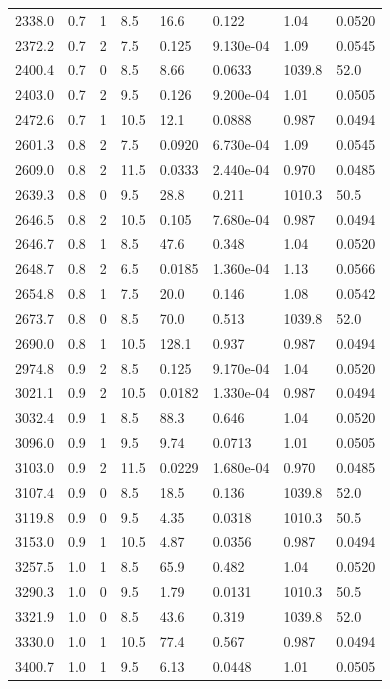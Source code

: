 \documentclass[preview]{standalone}
\begin{document}
{{{\begin{tabular}{L{1.2cm}C{1.2cm} C{0.3cm}C{0.5cm} C{1.4cm}C{1.4cm} C{1.4cm}C{1.4cm}}
  2338.0  &   0.7  & 1     & 8.5 &  16.6  & 0.122  & 1.04 &  0.0520   \\ 
  2372.2  &   0.7  & 2     & 7.5 &  0.125  & 9.130e-04  & 1.09 &  0.0545   \\ 
  2400.4  &   0.7  & 0     & 8.5 &  8.66  & 0.0633  & 1039.8 &  52.0   \\ 
  2403.0  &   0.7  & 2     & 9.5 &  0.126  & 9.200e-04  & 1.01 &  0.0505   \\ 
  2472.6  &   0.7  & 1     & 10.5 &  12.1  & 0.0888  & 0.987 &  0.0494   \\ 
  2601.3  &   0.8  & 2     & 7.5 &  0.0920  & 6.730e-04  & 1.09 &  0.0545   \\ 
  2609.0  &   0.8  & 2     & 11.5 &  0.0333  & 2.440e-04  & 0.970 &  0.0485   \\ 
  2639.3  &   0.8  & 0     & 9.5 &  28.8  & 0.211  & 1010.3 &  50.5   \\ 
  2646.5  &   0.8  & 2     & 10.5 &  0.105  & 7.680e-04  & 0.987 &  0.0494   \\ 
  2646.7  &   0.8  & 1     & 8.5 &  47.6  & 0.348  & 1.04 &  0.0520   \\ 
  2648.7  &   0.8  & 2     & 6.5 &  0.0185  & 1.360e-04  & 1.13 &  0.0566   \\ 
  2654.8  &   0.8  & 1     & 7.5 &  20.0  & 0.146  & 1.08 &  0.0542   \\ 
  2673.7  &   0.8  & 0     & 8.5 &  70.0  & 0.513  & 1039.8 &  52.0   \\ 
  2690.0  &   0.8  & 1     & 10.5 &  128.1  & 0.937  & 0.987 &  0.0494   \\ 
  2974.8  &   0.9  & 2     & 8.5 &  0.125  & 9.170e-04  & 1.04 &  0.0520   \\ 
  3021.1  &   0.9  & 2     & 10.5 &  0.0182  & 1.330e-04  & 0.987 &  0.0494   \\ 
  3032.4  &   0.9  & 1     & 8.5 &  88.3  & 0.646  & 1.04 &  0.0520   \\ 
  3096.0  &   0.9  & 1     & 9.5 &  9.74  & 0.0713  & 1.01 &  0.0505   \\ 
  3103.0  &   0.9  & 2     & 11.5 &  0.0229  & 1.680e-04  & 0.970 &  0.0485   \\ 
  3107.4  &   0.9  & 0     & 8.5 &  18.5  & 0.136  & 1039.8 &  52.0   \\ 
  3119.8  &   0.9  & 0     & 9.5 &  4.35  & 0.0318  & 1010.3 &  50.5   \\ 
  3153.0  &   0.9  & 1     & 10.5 &  4.87  & 0.0356  & 0.987 &  0.0494   \\ 
  3257.5  &   1.0  & 1     & 8.5 &  65.9  & 0.482  & 1.04 &  0.0520   \\ 
  3290.3  &   1.0  & 0     & 9.5 &  1.79  & 0.0131  & 1010.3 &  50.5   \\ 
  3321.9  &   1.0  & 0     & 8.5 &  43.6  & 0.319  & 1039.8 &  52.0   \\ 
  3330.0  &   1.0  & 1     & 10.5 &  77.4  & 0.567  & 0.987 &  0.0494   \\ 
  3400.7  &   1.0  & 1     & 9.5 &  6.13  & 0.0448  & 1.01 &  0.0505   \\ 
\hline 
\end{tabular} 

}}}
\end{document}
